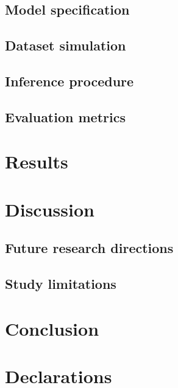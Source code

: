 \documentclass[
  authoryear,
  review,
  1p]{elsarticle}
\begin{document}
\subsection{Model specification}\label{sec-model}

\subsection{Dataset simulation}\label{sec-simulation}

\subsection{Inference procedure}\label{sec-inference}

\subsection{Evaluation metrics}\label{sec-evaluation}

\section{Results}\label{sec-results}

\section{Discussion}\label{sec-discussion}

\subsection{Future research directions}\label{sec-discussion_RD}

\subsection{Study limitations}\label{sec-discussion_limitations}

\section{Conclusion}\label{sec-conclusion}

\newpage{}

\section*{Declarations}\label{declarations}
\end{document}
